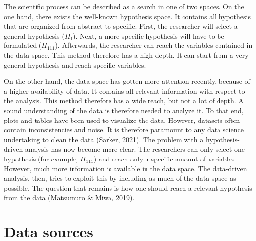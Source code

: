 \documentclass[10pt, a4paper, twocolumn]{article} %
\begin{document}
The scientific process can be described as a search in one of two spaces.
On the one hand, there exists the well-known hypothesis space. It contains all hypothesis that are organized from abstract to specific. First, the researcher will select a general hypothesis ($H_1$). Next, a more specific hypothesis will have to be formulated ($H_{111}$). Afterwards, the researcher can reach the variables contained in the data space. This method therefore has a high depth. It can start from a very general hypothesis and reach specific variables.

On the other hand, the data space has gotten more attention recently, because of a higher availability of data. It contains all relevant information with respect to the analysis. This method therefore has a wide reach, but not a lot of depth. A sound understanding of the data is therefore needed to analyze it. To that end, plots and tables have been used to visualize the data. However, datasets often contain inconsistencies and noise. It is therefore paramount to any data science undertaking to clean the data (Sarker, 2021).
The problem with a hypothesis-driven analysis has now become more clear. The researchers can only select one hypothesis (for example, $H_{111}$) and reach only a specific amount of variables. However, much more information is available in the data space. The data-driven analysis, then, tries to exploit this by including as much of the data space as possible. The question that remains is how one should reach a relevant hypothesis from the data (Matsumuro \& Miwa, 2019).


\section{Data sources}
\end{document}
